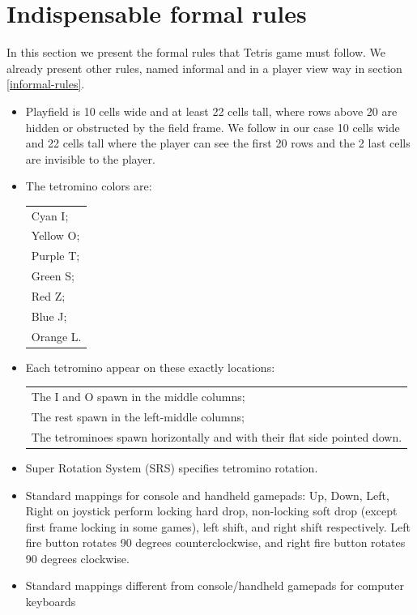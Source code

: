 \documentclass[a4paper]{article}
\begin{document}
\section{Indispensable formal rules}\label{rules}
In this section we present the formal rules that Tetris game must follow. We already present other rules, named informal and in a player view way in section \ref{informal-rules}.

\begin{itemize}
	\item Playfield is 10 cells wide and at least 22 cells tall, where rows above 20 are hidden or obstructed by the field frame. We follow in our case 10 cells wide and 22 cells tall where the player can see the first 20 rows and the 2 last cells are invisible to the player. 
	\item The tetromino colors are:
	
	\begin{tabular}{l}
		Cyan I;\\
		Yellow O;\\
		Purple T;\\
		Green S;\\
		Red Z;\\
		Blue J;\\
		Orange L.\\
	\end{tabular}
	
	\item Each tetromino appear on these exactly locations:
	
	\begin{tabular}{l}
		The I and O spawn in the middle columns;\\
		The rest spawn in the left-middle columns;\\
		The tetrominoes spawn horizontally and with their flat side pointed down.\\
	\end{tabular}
	
	\item Super Rotation System (SRS) specifies tetromino rotation.
	
	\item Standard mappings for console and handheld gamepads:
	Up, Down, Left, Right on joystick perform locking hard drop, non-locking soft drop (except first frame locking in some games), left shift, and right shift respectively.
	Left fire button rotates 90 degrees counterclockwise, and right fire button rotates 90 degrees clockwise.
	
	\item Standard mappings different from console/handheld gamepads for computer keyboards
	

\end{itemize}
\end{document}
